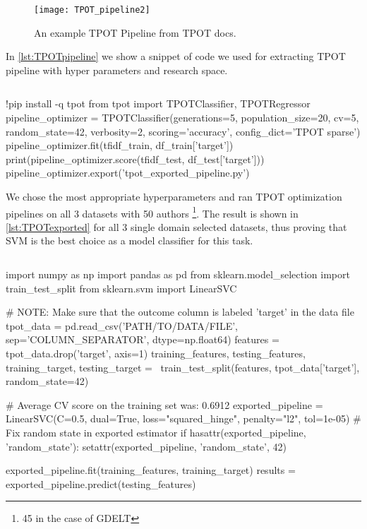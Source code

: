 \begin{figure}[ht]
	\centering
	\texttt{[image: TPOT\_pipeline2]}
	\caption[Tree-based Pipeline Optimization Tool pipeline example]{An example TPOT Pipeline from TPOT docs.}
	\label{fig:TPOT_pipeline}
\end{figure}

In \autoref{lst:TPOTpipeline} we show a snippet of code we used for extracting TPOT pipeline with hyper parameters and research space. 


\begin{lstlisting}[frame=none,caption={TPOT pipeline generation.},captionpos=b,label=lst:TPOTpipeline]
\end{lstlisting}
\begin{python}	
	!pip install -q tpot
	from tpot import TPOTClassifier, TPOTRegressor
	pipeline_optimizer = TPOTClassifier(generations=5, population_size=20, cv=5,
	random_state=42, verbosity=2, scoring='accuracy', config_dict='TPOT sparse')
	pipeline_optimizer.fit(tfidf_train, df_train['target'])
	print(pipeline_optimizer.score(tfidf_test, df_test['target']))
	pipeline_optimizer.export('tpot_exported_pipeline.py')
\end{python}

We chose the most appropriate hyperparameters and ran TPOT optimization pipelines on all 3 datasets with 50 authors \footnote{45 in the case of GDELT}. The result is shown in \autoref{lst:TPOTexported} for all 3 single domain selected datasets, thus proving that SVM is the best choice as a model classifier for this task.

\begin{lstlisting}[frame=none,caption={TPOT pipeline extracted.},captionpos=b,label=lst:TPOTexported]
\end{lstlisting}
\begin{python}	
	import numpy as np
	import pandas as pd
	from sklearn.model_selection import train_test_split
	from sklearn.svm import LinearSVC
	
	# NOTE: Make sure that the outcome column is labeled 'target' in the data file
	tpot_data = pd.read_csv('PATH/TO/DATA/FILE', sep='COLUMN_SEPARATOR', dtype=np.float64)
	features = tpot_data.drop('target', axis=1)
	training_features, testing_features, training_target, testing_target = \
	train_test_split(features, tpot_data['target'], random_state=42)
	
	# Average CV score on the training set was: 0.6912
	exported_pipeline = LinearSVC(C=0.5, dual=True, loss="squared_hinge", penalty="l2", tol=1e-05)
	# Fix random state in exported estimator
	if hasattr(exported_pipeline, 'random_state'):
	setattr(exported_pipeline, 'random_state', 42)
	
	exported_pipeline.fit(training_features, training_target)
	results = exported_pipeline.predict(testing_features)
\end{python}